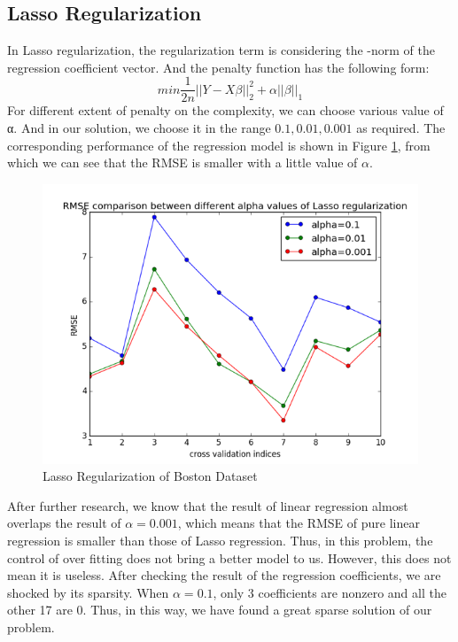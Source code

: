 \documentclass{article}
\begin{document}
\subsection{Lasso Regularization}
In Lasso regularization, the regularization term is considering the -norm of the regression coefficient vector. And the penalty function has the following form:
\begin{equation*}
min\frac{1}{2n}||Y-X\beta||^2_2+\alpha||\beta||_1
\end{equation*}
For different extent of penalty on the complexity, we can choose various value of α. And in our solution, we choose it in the range ${0.1,0.01,0.001}$ as required. The corresponding performance of the regression model is shown in Figure \ref{fig:lar}, from which we can see that the RMSE is smaller with a little value of $\alpha$. 
\begin{figure}[htbp]
\centering
\includegraphics[width=.6\textwidth]{lar.png}
\caption{Lasso Regularization of Boston Dataset}
\label{fig:lar}
\end{figure}
After further research, we know that the result of linear regression almost overlaps the result of $\alpha=0.001$, which means that the RMSE of pure linear regression is smaller than those of Lasso regression. Thus, in this problem, the control of over fitting does not bring a better model to us. However, this does not mean it is useless. After checking the result of the regression coefficients, we are shocked by its sparsity. When $\alpha=0.1$, only 3 coefficients are nonzero and all the other 17 are 0. Thus, in this way, we have found a great sparse solution of our problem.
\end{document}
